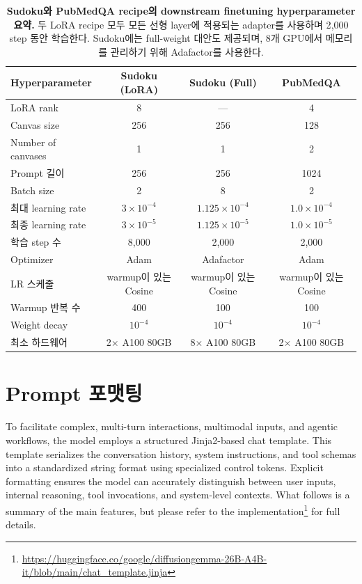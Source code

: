 \documentclass[11pt, a4paper, logo, copyright, gdm]{google}
\begin{document}
\begin{table}[h]
\centering
\small
\begin{tabular}{lccc}
\toprule
\textbf{Hyperparameter} & \textbf{Sudoku (LoRA)} & \textbf{Sudoku (Full)} & \textbf{PubMedQA} \\
\midrule
LoRA rank & 8 & --- & 4 \\
Canvas size & 256 & 256 & 128 \\
Number of canvases & 1 & 1 & 2 \\
Prompt 길이 & 256 & 256 & 1024 \\
Batch size & 2 & 8 & 2 \\
최대 learning rate & $3 \times 10^{-4}$ & $1.125\times 10^{-4}$ & $1.0 \times 10^{-4}$ \\
최종 learning rate & $3 \times 10^{-5}$ & $1.125\times 10^{-5}$ & $1.0 \times 10^{-5}$ \\
학습 step 수 & 8{,}000 & 2{,}000 & 2{,}000 \\
Optimizer & Adam & Adafactor & Adam \\
LR 스케줄 & warmup이 있는 Cosine & warmup이 있는 Cosine & warmup이 있는 Cosine \\
Warmup 반복 수 & 400 & 100 & 100 \\
Weight decay & $10^{-4}$ & $10^{-4}$ & $10^{-4}$ \\
최소 하드웨어 & 2$\times$ A100 80GB & 8$\times$ A100 80GB & 2$\times$ A100 80GB \\
\bottomrule
\end{tabular}
\caption{\textbf{Sudoku와 PubMedQA recipe의 downstream finetuning hyperparameter 요약.} 두 LoRA recipe 모두 모든 선형 layer에 적용되는 adapter를 사용하며 2{,}000 step 동안 학습한다. Sudoku에는 full-weight 대안도 제공되며, 8개 GPU에서 메모리를 관리하기 위해 Adafactor를 사용한다.}
\label{tab:sft_recipes}
\end{table}







\section{Prompt 포맷팅} \label{sec:prompt_formatting}

To facilitate complex, multi-turn interactions, multimodal inputs, and agentic workflows, the model employs a structured Jinja2-based chat template. This template serializes the conversation history, system instructions, and tool schemas into a standardized string format using specialized control tokens. Explicit formatting ensures the model can accurately distinguish between user inputs, internal reasoning, tool invocations, and system-level contexts. What follows is a summary of the main features, but please refer to the implementation\footnote{\url{https://huggingface.co/google/diffusiongemma-26B-A4B-it/blob/main/chat_template.jinja}} for full details.
\end{document}
